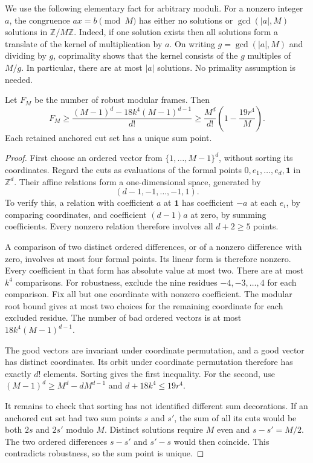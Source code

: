 We use the following elementary fact for arbitrary moduli. For a nonzero
integer $a$, the congruence $ax=b\pmod M$ has either no solutions or
$\gcd(|a|,M)$ solutions in $\mathbb Z/M\mathbb Z$. Indeed, if one solution
exists then all solutions form a translate of the kernel of multiplication
by $a$. On writing $g=\gcd(|a|,M)$ and dividing by $g$, coprimality shows
that the kernel consists of the $g$ multiples of $M/g$. In particular,
there are at most $|a|$ solutions. No primality assumption is needed.

\begin{lemma}
\label{geo:frame-supply}
Let $F_M$ be the number of robust modular frames. Then
\[
 F_M\geq
 \frac{(M-1)^d-18k^4(M-1)^{d-1}}{d!}
 \geq\frac{M^d}{d!}\left(1-\frac{19r^4}{M}\right).
\]
Each retained anchored cut set has a unique sum point.
\end{lemma}
\begin{proof}
First choose an ordered vector from $\{1,\ldots,M-1\}^d$, without sorting
its coordinates. Regard the cuts as evaluations of the formal points
$0,e_1,\ldots,e_d,\boldsymbol 1$ in $\mathbb Z^d$. Their affine relations
form a one-dimensional space, generated by
\[
 (d-1,-1,\ldots,-1,1).
\]
To verify this, a relation with coefficient $a$ at $\boldsymbol 1$ has
coefficient $-a$ at each $e_i$, by comparing coordinates, and coefficient
$(d-1)a$ at zero, by summing coefficients. Every nonzero relation
therefore involves all $d+2\geq5$ points.

A comparison of two distinct ordered differences, or of a nonzero
difference with zero, involves at most four formal points. Its linear
form is therefore nonzero. Every coefficient in that form has absolute
value at most two. There are at most $k^4$ comparisons. For robustness,
exclude the nine residues $-4,-3,\ldots,4$ for each comparison. Fix all
but one coordinate with nonzero coefficient. The modular root bound gives
at most two choices for the remaining coordinate for each excluded
residue. The number of bad ordered vectors is at most
$18k^4(M-1)^{d-1}$.

The good vectors are invariant under coordinate permutation, and a good
vector has distinct coordinates. Its orbit under coordinate permutation
therefore has exactly $d!$ elements. Sorting gives the first inequality.
For the second, use
$(M-1)^d\geq M^d-dM^{d-1}$ and
$d+18k^4\leq19r^4$.

It remains to check that sorting has not identified different sum
decorations. If an anchored cut set had two sum points $s$ and $s'$, the
sum of all its cuts would be both $2s$ and $2s'$ modulo $M$. Distinct
solutions require $M$ even and $s-s'=M/2$. The two ordered differences
$s-s'$ and $s'-s$ would then coincide. This contradicts robustness, so
the sum point is unique.
\end{proof}

